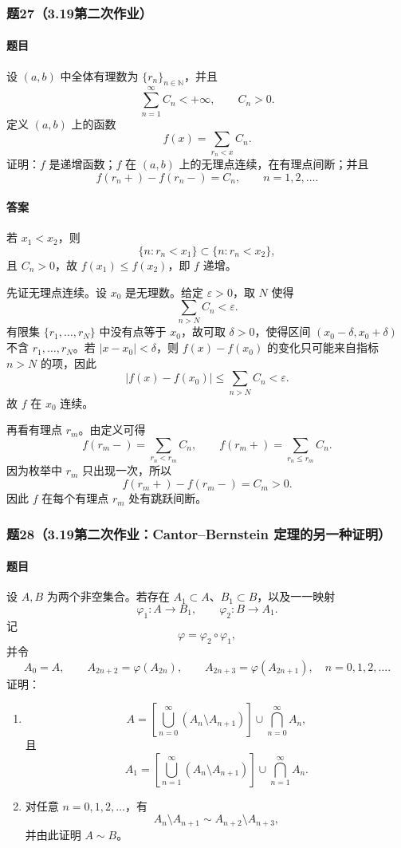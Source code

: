 \documentclass{article}
\newcommand{\N}{\mathbb{N}}
\newcommand{\eps}{\varepsilon}
\begin{document}
\subsubsection*{题27（3.19第二次作业）}
\paragraph{题目}设 $(a,b)$ 中全体有理数为 $\{r_n\}_{n\in\N}$，并且
\[
\sum_{n=1}^{\infty}C_n<+\infty,
\qquad C_n>0.
\]
定义 $(a,b)$ 上的函数
\[
f(x)=\sum_{r_n<x}C_n.
\]
证明：$f$ 是递增函数；$f$ 在 $(a,b)$ 上的无理点连续，在有理点间断；并且
\[
f(r_n+)-f(r_n-)=C_n,
\qquad n=1,2,\ldots.
\]

\paragraph{答案}若 $x_1<x_2$，则
\[
\{n:r_n<x_1\}\subset\{n:r_n<x_2\},
\]
且 $C_n>0$，故 $f(x_1)\le f(x_2)$，即 $f$ 递增。

先证无理点连续。设 $x_0$ 是无理数。给定 $\eps>0$，取 $N$ 使得
\[
\sum_{n>N}C_n<\eps.
\]
有限集 $\{r_1,
\ldots,r_N\}$ 中没有点等于 $x_0$，故可取 $\delta>0$，使得区间 $(x_0-\delta,x_0+\delta)$ 不含 $r_1,
\ldots,r_N$。若 $|x-x_0|<\delta$，则 $f(x)-f(x_0)$ 的变化只可能来自指标 $n>N$ 的项，因此
\[
|f(x)-f(x_0)|\le\sum_{n>N}C_n<\eps.
\]
故 $f$ 在 $x_0$ 连续。

再看有理点 $r_m$。由定义可得
\[
f(r_m-)=\sum_{r_n<r_m}C_n,
\qquad
f(r_m+)=\sum_{r_n\le r_m}C_n.
\]
因为枚举中 $r_m$ 只出现一次，所以
\[
f(r_m+)-f(r_m-)=C_m>0.
\]
因此 $f$ 在每个有理点 $r_m$ 处有跳跃间断。

\subsubsection*{题28（3.19第二次作业：Cantor--Bernstein 定理的另一种证明）}
\paragraph{题目}设 $A,B$ 为两个非空集合。若存在 $A_1\subset A$、$B_1\subset B$，以及一一映射
\[
\varphi_1:A\to B_1,
\qquad
\varphi_2:B\to A_1.
\]
记
\[
\varphi=\varphi_2\circ\varphi_1,
\]
并令
\[
A_0=A,
\qquad
A_{2n+2}=\varphi(A_{2n}),
\qquad
A_{2n+3}=\varphi(A_{2n+1}),
\quad n=0,1,2,\ldots.
\]
证明：
\begin{enumerate}[label=(\arabic*)]
\item
\[
A=\left[\bigcup_{n=0}^{\infty}(A_n\setminus A_{n+1})\right]
\cup \bigcap_{n=0}^{\infty}A_n,
\]
且
\[
A_1=\left[\bigcup_{n=1}^{\infty}(A_n\setminus A_{n+1})\right]
\cup \bigcap_{n=1}^{\infty}A_n.
\]
\item 对任意 $n=0,1,2,
\ldots$，有
\[
A_n\setminus A_{n+1}\sim A_{n+2}\setminus A_{n+3},
\]
并由此证明 $A\sim B$。
\end{enumerate}
\end{document}
